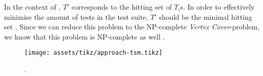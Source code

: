 \noindent In the context of \tsm{}, $T'$ corresponds to the hitting set of $T_i$s. In order to effectively minimise the amount of tests in the test suite, $T'$ should be the minimal hitting set \cite{10.1002/stv.430}. Since we can reduce this problem to the NP-complete \emph{Vertex Cover}-problem, we know that this problem is NP-complete as well \cite{10.5555/574848}.

\begin{figure}[htbp!]
	\centering
	\texttt{[image: assets/tikz/approach-tsm.tikz]}
	\caption{\tsm{}.}
	\label{fig:tsm}
\end{figure}